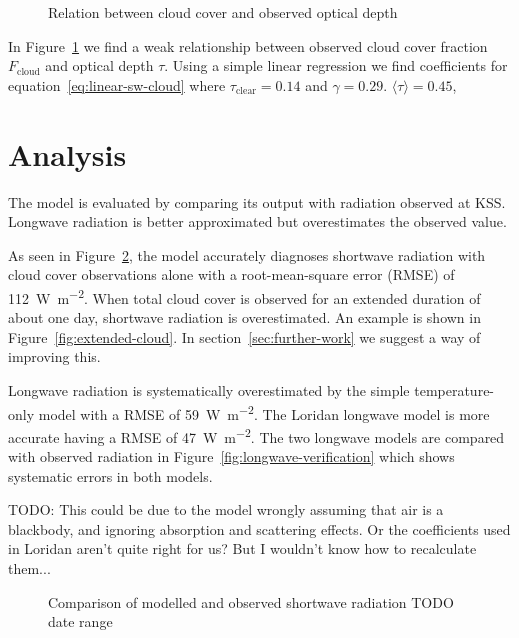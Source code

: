 \documentclass[a4paper,titlepage, twoside]{report}
\begin{document}
\begin{figure}
\centering

\caption{Relation between cloud cover and observed optical depth}
\label{fig:cloud-tau-fit}
\end{figure}

In Figure~\ref{fig:cloud-tau-fit} we find a weak relationship between observed cloud cover fraction $F_\mathrm{cloud}$ and optical depth $\tau$.  Using a simple linear regression we find coefficients for equation~\ref{eq:linear-sw-cloud} where $\tau_\mathrm{clear} = 0.14$ and $\gamma =  0.29$.  $\langle \tau \rangle = 0.45$,

\section{Analysis}
\label{sec:model-analysis}
The model is evaluated by comparing its output with radiation observed at KSS.  Longwave radiation is better approximated but overestimates the observed value.  

As seen in Figure~\ref{fig:shortwave-verification}, the model accurately diagnoses shortwave radiation with cloud cover observations alone with a root-mean-square error (RMSE) of \SI{112}{\watt\per\meter\squared}.  When total cloud cover is observed for an extended duration of about one day, shortwave radiation is overestimated.  An example is shown in Figure~\ref{fig:extended-cloud}.  In section~\ref{sec:further-work} we suggest a way of improving this.

Longwave radiation is systematically overestimated by the simple temperature-only model with a RMSE of \SI{59}{\watt\per\meter\squared}.  The Loridan longwave model is more accurate having a RMSE of \SI{47}{\watt\per\meter\squared}.  The two longwave models are compared with observed radiation in Figure~\ref{fig:longwave-verification} which shows systematic errors in both models.

TODO: This could be due to the model wrongly assuming that air is a blackbody, and ignoring absorption and scattering effects.  Or the coefficients used in Loridan aren't quite right for us?  But I wouldn't know how to recalculate them...
\begin {figure}
\centering

\caption{Comparison of modelled and observed shortwave radiation TODO date range}
\label{fig:shortwave-verification}
\end{figure}
\end{document}
